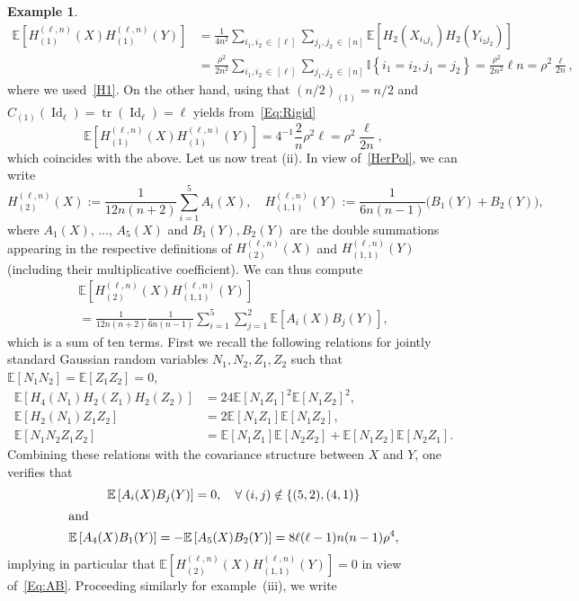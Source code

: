 \documentclass[10pt]{amsart}
\theoremstyle{definition}\newtheorem{defi}[theo]{Definition}\newtheorem{rema}[theo]{Remark}\newtheorem{exam}[theo]{Example}\newtheorem{exem}[theo]{Example}\newtheorem{nota}[theo]{Notation}
\DeclareMathOperator{\Id}{Id}
\DeclareMathOperator{\Tr}{tr}
\newcommand{\E}[1]{\mathbb{E}\left[#1\right]}
\newcommand{\ind}[1]{\mathbb{I}
\left\{#1\right\}}
\let\oldforall\forall
\renewcommand*{\forall}{\mathrel{\oldforall}}
\begin{document}
\begin{exam}
\begin{align*}
\E{H_{(1)}^{(\ell,n)}(X)H_{(1)}^{(\ell,n)}(Y)} &= \frac{1}{4n^2} \sum_{i_1,i_2\,\in\,[\ell]}\sum_{j_1,j_2\,\in\,[n]} \E{H_2\left(X_{i_1j_1}\right)H_2\left(Y_{i_2j_2}\right)}\\
&= \frac{\rho^2}{2n^2} \sum_{i_1,i_2\,\in\,[\ell]}\sum_{j_1,j_2\,\in\,[n]} \ind{i_1=i_2,j_1=j_2} = \frac{\rho^2}{2n^2}\ell n = \rho^2 \frac{\ell}{2n},
\end{align*}
where we used~\eqref{H1}. On the other hand, using that $(n/2)_{(1)}=n/2$ and $C_{(1)}(\Id_{\ell})=\Tr(\Id_{\ell})=\ell$ yields from~\eqref{Eq:Rigid}
\[
\E{H_{(1)}^{(\ell,n)}(X)H_{(1)}^{(\ell,n)}(Y)} = 4^{-1} \frac{2}{n} \rho^2 \ell =
\rho^2 \frac{\ell}{2n},
\]
which coincides with the above. Let us now treat (ii). In view of~\eqref{HerPol}, we can write
\[
H_{(2)}^{(\ell,n)}(X) := \frac{1}{12n(n+2)}\sum_{i=1}^5A_i(X), \quad H_{(1,1)}^{(\ell,n)}(Y) :=
\frac{1}{6n(n-1)} \big(B_1(Y)+B_2(Y)\big),
\]
where $A_1(X),\,\ldots,\,A_5(X)$ and $B_1(Y),B_2(Y)$ are the double summations appearing in the respective definitions of $H_{(2)}^{(\ell,n)}(X)$ and $H_{(1,1)}^{(\ell,n)}(Y)$ (including their multiplicative coefficient). We can thus compute
\begin{multline}\label{Eq:AB}
\E{H_{(2)}^{(\ell,n)}(X) H_{(1,1)}^{(\ell,n)}(Y)}\\
= \frac{1}{12n(n+2)} \frac{1}{6n(n-1)}
\sum_{i=1}^5\sum_{j=1}^2 \E{A_i(X)B_j(Y)},
\end{multline}
which is a sum of ten terms. First we recall the following relations for jointly standard Gaussian random variables $N_1,N_2,Z_1,Z_2$ such that $\E{N_1N_2}=\E{Z_1Z_2}=0$,
\begin{align*}
\E{H_4(N_1)H_2(Z_1)H_2(Z_2)} &= 24\E{N_1Z_1}^2\E{N_1Z_2}^2,\\
\E{H_2(N_1)Z_1Z_2} &= 2\E{N_1Z_1}\E{N_1Z_2},\\
\E{N_1N_2Z_1Z_2} &=
\E{N_1Z_1}\E{N_2Z_2}+
\E{N_1Z_2}\E{N_2Z_1}.
\end{align*}
Combining these relations with the covariance structure between $X$ and $Y$, one verifies that
\begin{gather*}
\E{A_i(X)B_j(Y)} = 0, \quad \forall (i,j)\notin \{(5,2),(4,1)\}
\\
\intertext{and}
\E{A_4(X)B_1(Y)} = -\E{A_5(X)B_2(Y)} = 8\ell(\ell-1)n(n-1)\rho^4,
\end{gather*}
implying in particular that $\mathbb{E}[H_{(2)}^{(\ell,n)}(X) H_{(1,1)}^{(\ell,n)}(Y)] =0$ in view of~\eqref{Eq:AB}. Proceeding similarly for example~(iii), we write

\end{exam}
\end{document}
